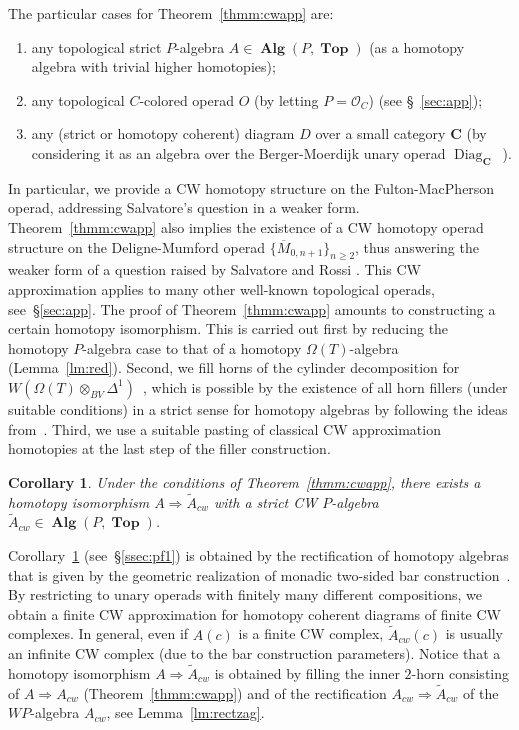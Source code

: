 \documentclass{amsart}
\newcounter{thmMaincounter}
\newtheorem{corollaryM}[thmMaincounter]{Corollary}
\theoremstyle{definition}
\theoremstyle{remark}
\newcommand{\Cc}{\mathbf{C}}
\DeclareMathOperator{\Top}{\mathbf{Top}}
\DeclareMathOperator{\Alg}{\mathbf{Alg}}
\DeclareMathOperator{\Diag}{Diag}
\begin{document}
	The particular cases for Theorem~\ref{thmm:cwapp} are:
	\begin{enumerate}[label=(\roman*)]
		\item any topological strict $P$-algebra $A\in\Alg(P,\Top)$ (as a homotopy algebra with trivial higher homotopies);
		\item any topological $C$-colored operad $O$ (by letting $P=\mathcal{O}_{C}$) (see \S~\ref{sec:app});
		\item any (strict or homotopy coherent) diagram $D$ over a small category $\Cc$ (by considering it as an algebra over the Berger-Moerdijk unary operad $\Diag_{\Cc}$~\cite{be-mo-06}).
	\end{enumerate}
	In particular, we provide a CW homotopy structure on the Fulton-MacPherson operad, addressing Salvatore's question \cite[p.449]{sa-22} 
	in a weaker form.
	Theorem~\ref{thmm:cwapp} also implies the existence of a CW homotopy operad structure on the Deligne-Mumford operad $\{ \overline{M}_{0,n+1} \}_{n \geqslant 2}$, thus answering the weaker form of a question raised by Salvatore and Rossi \cite[\S1.1 (1)]{rossi-sa24}.
	This CW approximation applies to many other well-known topological operads, see~\S\ref{sec:app}.
	The proof of Theorem~\ref{thmm:cwapp} amounts to constructing a certain homotopy isomorphism. 
	This is carried out first by reducing the homotopy $P$-algebra case to that of a homotopy $\Omega(T)$-algebra (Lemma~\ref{lm:red}).
	Second, we fill horns of the cylinder decomposition for $W(\Omega(T)\otimes_{BV}\Delta^{1})$~\cite{ci-mo-11}, which is possible by the existence of all horn fillers (under suitable conditions) in a strict sense for homotopy algebras by following the ideas from~\cite{co-po-86}.
	Third, we use a suitable pasting of classical CW approximation homotopies at the last step of the filler construction.
	
	\begin{corollaryM}\label{corm:rect}
		Under the conditions of Theorem~\ref{thmm:cwapp}, there exists a homotopy isomorphism $A\Rightarrow \widetilde{A}_{cw}$ with a strict CW $P$-algebra $\widetilde{A}_{cw}\in \Alg(P,\Top)$.
	\end{corollaryM}
	
	Corollary~\ref{corm:rect} (see~\S\ref{ssec:pf1}) is obtained by the rectification of homotopy algebras that is given by the geometric realization of monadic two-sided bar construction~\cite{be-mo-06'}.
	By restricting to unary operads with finitely many different compositions, we obtain a finite CW approximation for homotopy coherent diagrams of finite CW complexes.
	In general, even if $A(c)$ is a finite CW complex, $\widetilde{A}_{cw}(c)$ is usually an infinite CW complex (due to the bar construction parameters).
	Notice that a homotopy isomorphism $A\Rightarrow \widetilde{A}_{cw}$ is obtained by filling the inner $2$-horn consisting of $A\Rightarrow A_{cw}$ (Theorem~\ref{thmm:cwapp}) and of the rectification $A_{cw}\Rightarrow \widetilde{A}_{cw}$ of the $WP$-algebra $A_{cw}$, see Lemma~\ref{lm:rectzag}. 
	
\end{document}
